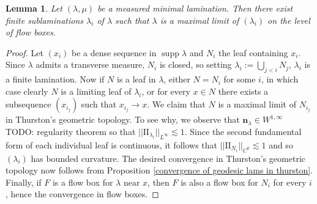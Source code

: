 \documentclass[reqno,11pt]{amsart}
\DeclareMathOperator{\supp}{supp}
\newcommand{\Two}{\mathrm{I\!I}}
\newcommand{\normal}{\mathbf n}
\newtheorem{lemma}[theorem]{Lemma}
\theoremstyle{definition}
\numberwithin{equation}{section}
\begin{document}
\begin{lemma}\label{reduction to finite case}
Let $(\lambda, \mu)$ be a measured minimal lamination.
Then there exist finite sublaminations $\lambda_i$ of $\lambda$ such that $\lambda$ is a maximal limit of $(\lambda_i)$ on the level of flow boxes.
\end{lemma}
\begin{proof}
Let $(x_i)$ be a dense sequence in $\supp \lambda$ and $N_i$ the leaf containing $x_i$.
Since $\lambda$ admits a transverse measure, $N_i$ is closed, so setting $\lambda_i := \bigcup_{j < i} N_j$, $\lambda_i$ is a finite lamination.
Now if $N$ is a leaf in $\lambda$, either $N = N_i$ for some $i$, in which case clearly $N$ is a limiting leaf of $\lambda_i$, or for every $x \in N$ there exists a subsequence $(x_{i_j})$ such that $x_{i_j} \to x$.
We claim that $N$ is a maximal limit of $N_{i_j}$ in Thurston's geometric topology.
To see why, we observe that $\normal_\lambda \in W^{1, \infty}$ TODO: regularity theorem so that $||\Two_{\lambda_i}||_{L^\infty} \lesssim 1$.
Since the second fundamental form of each individual leaf is continuous, it follows that $||\Two_{N_i}||_{C^0} \lesssim 1$ and so $(\lambda_i)$ has bounded curvature.
The desired convergence in Thurston's geometric topology now follows from Proposition \ref{convergence of geodesic lams in thurston}.
Finally, if $F$ is a flow box for $\lambda$ near $x$, then $F$ is also a flow box for $N_i$ for every $i$, hence the convergence in flow boxes.
\end{proof}

\end{document}
